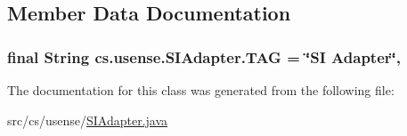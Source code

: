 \subsection{Member Data Documentation}
\hypertarget{classcs_1_1usense_1_1_s_i_adapter_a3e34f3e4d2346e961e53fa5a2ab6df94}{}
\subsubsection[{T\+A\+G}]{\setlength{\rightskip}{0pt plus 5cm}final String cs.\+usense.\+S\+I\+Adapter.\+T\+A\+G = \char`\"{}S\+I Adapter\char`\"{}\hspace{0.3cm}{\ttfamily [static]}, {\ttfamily [private]}}\label{classcs_1_1usense_1_1_s_i_adapter_a3e34f3e4d2346e961e53fa5a2ab6df94}


The documentation for this class was generated from the following file\+:\begin{DoxyCompactItemize}
\item 
src/cs/usense/\hyperlink{_s_i_adapter_8java}{S\+I\+Adapter.\+java}\end{DoxyCompactItemize}
